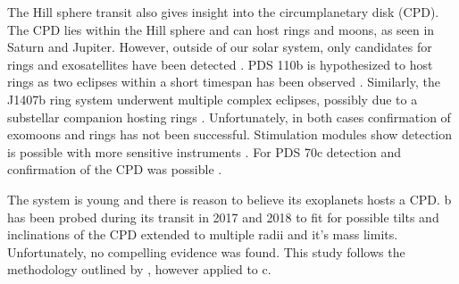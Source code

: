%




%

The Hill sphere transit also gives insight into the circumplanetary disk (CPD). 
%
The CPD lies within the Hill sphere and can host rings and moons, as seen in Saturn and Jupiter. 
%
However, outside of our solar system, only candidates for rings and exosatellites have been detected \citep{Osborn_2019, Kenworthy_Mamajek_2015,Mamajek_2012,Rieder_2016}. 
%
PDS 110b is hypothesized to host rings as two eclipses within a short timespan has been observed \citep{Osborn_2019}. 
Similarly, the J1407b ring system underwent multiple complex eclipses, possibly due to a substellar companion hosting rings \citep{Kenworthy_Mamajek_2015,Mamajek_2012,Rieder_2016}. 
%
Unfortunately, in both cases confirmation of exomoons and rings has not been successful. 
%
Stimulation modules show detection is possible with more sensitive instruments \citep{Alshehhi_2020,Akinsanmi_2017}. 
%
For PDS 70c detection and confirmation of the CPD was possible \citep{Benisty_2021}. 

The \pic system is young and there is reason to believe its exoplanets hosts a CPD. 
%
\pic b has been probed during its transit in 2017 and 2018 \citep{Kenworthy_2021} to fit for possible tilts and inclinations of the CPD extended to multiple radii and it's mass limits. 
%
Unfortunately, no compelling evidence was found. 
%
This study follows the methodology outlined by \cite{Kenworthy_2021}, however applied to \pic c. 











